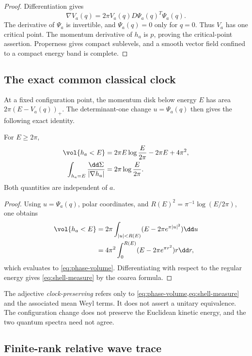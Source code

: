 \begin{proof}
Differentiation gives
\[
 \nabla V_a(q)=2\pi V_a(q)D\Psi_a(q)^T\Psi_a(q).
\]
The derivative of \(\Psi_a\) is invertible, and \(\Psi_a(q)=0\) only for
\(q=0\).  Thus \(V_a\) has one critical point.  The momentum derivative of
\(h_a\) is \(p\), proving the critical-point assertion.  Properness gives
compact sublevels, and a smooth vector field confined to a compact energy
band is complete.
\end{proof}

\subsection{The exact common classical clock}

At a fixed configuration point, the momentum disk below energy \(E\) has
area \(2\pi(E-V_a(q))_+\).  The determinant-one change
\(u=\Psi_a(q)\) then gives the following exact identity.

\begin{proposition}
\label{prop:shell-volume}
For \(E\ge2\pi\),
\begin{align}
 \vol\{h_a<E\}
 &=2\pi E\log\frac{E}{2\pi}-2\pi E+4\pi^2,
 \label{eq:phase-volume}\\
 \int_{h_a=E}\frac{\dd\Sigma}{|\nabla h_a|}
 &=2\pi\log\frac{E}{2\pi}.
 \label{eq:shell-measure}
\end{align}
Both quantities are independent of \(a\).
\end{proposition}

\begin{proof}
Using \(u=\Psi_a(q)\), polar coordinates, and
\(R(E)^2=\pi^{-1}\log(E/2\pi)\), one obtains
\begin{align*}
 \vol\{h_a<E\}
 &=2\pi\int_{|u|<R(E)}(E-2\pi e^{\pi|u|^2})\dd u\\
 &=4\pi^2\int_0^{R(E)}(E-2\pi e^{\pi r^2})r\dd r,
\end{align*}
which evaluates to \cref{eq:phase-volume}.  Differentiating with respect to
the regular energy gives \cref{eq:shell-measure} by the coarea formula.
\end{proof}

The adjective \emph{clock-preserving} refers only to
\cref{eq:phase-volume,eq:shell-measure} and the associated mean Weyl terms.
It does not assert a unitary equivalence.  The configuration change does not
preserve the Euclidean kinetic energy, and the two quantum spectra need not
agree.

\subsection{Finite-rank relative wave trace}

